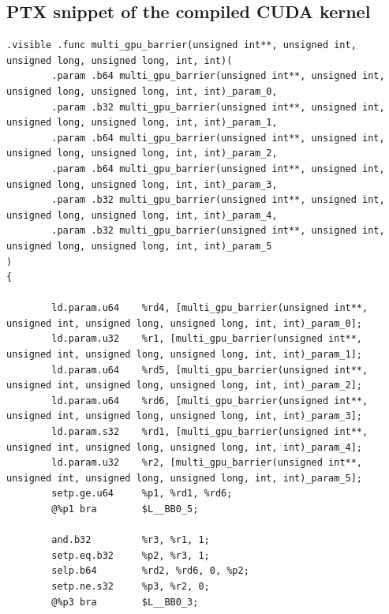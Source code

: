\documentclass[acmsmall]{acmart}
\begin{document}
\subsection{PTX snippet of the compiled CUDA kernel}


\lstset{language=PTX}
\begin{lstlisting}[caption={Compiled PTX snippet of listing \ref{lst:barrier}. We used \href{https://docs.nvidia.com/cuda/cuda-compiler-driver-nvcc/}{\texttt{nvcc} \faExternalLinkSquare} v12.6 with the flag \texttt{-O3 -gencode=arch=compute\_90,code=sm\_90}.}, label={lst:barrier-ptx}]
.visible .func multi_gpu_barrier(unsigned int**, unsigned int, unsigned long, unsigned long, int, int)(
        .param .b64 multi_gpu_barrier(unsigned int**, unsigned int, unsigned long, unsigned long, int, int)_param_0,
        .param .b32 multi_gpu_barrier(unsigned int**, unsigned int, unsigned long, unsigned long, int, int)_param_1,
        .param .b64 multi_gpu_barrier(unsigned int**, unsigned int, unsigned long, unsigned long, int, int)_param_2,
        .param .b64 multi_gpu_barrier(unsigned int**, unsigned int, unsigned long, unsigned long, int, int)_param_3,
        .param .b32 multi_gpu_barrier(unsigned int**, unsigned int, unsigned long, unsigned long, int, int)_param_4,
        .param .b32 multi_gpu_barrier(unsigned int**, unsigned int, unsigned long, unsigned long, int, int)_param_5
)
{

        ld.param.u64    %rd4, [multi_gpu_barrier(unsigned int**, unsigned int, unsigned long, unsigned long, int, int)_param_0];
        ld.param.u32    %r1, [multi_gpu_barrier(unsigned int**, unsigned int, unsigned long, unsigned long, int, int)_param_1];
        ld.param.u64    %rd5, [multi_gpu_barrier(unsigned int**, unsigned int, unsigned long, unsigned long, int, int)_param_2];
        ld.param.u64    %rd6, [multi_gpu_barrier(unsigned int**, unsigned int, unsigned long, unsigned long, int, int)_param_3];
        ld.param.s32    %rd1, [multi_gpu_barrier(unsigned int**, unsigned int, unsigned long, unsigned long, int, int)_param_4];
        ld.param.u32    %r2, [multi_gpu_barrier(unsigned int**, unsigned int, unsigned long, unsigned long, int, int)_param_5];
        setp.ge.u64     %p1, %rd1, %rd6;
        @%p1 bra        $L__BB0_5;

        and.b32         %r3, %r1, 1;
        setp.eq.b32     %p2, %r3, 1;
        selp.b64        %rd2, %rd6, 0, %p2;
        setp.ne.s32     %p3, %r2, 0;
        @%p3 bra        $L__BB0_3;


\end{lstlisting}
\end{document}
